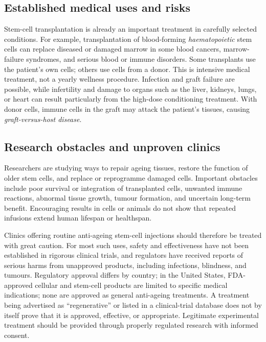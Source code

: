 \documentclass[11pt,oneside]{report}
\begin{document}
\subsection*{Established medical uses and risks}

Stem-cell transplantation is already an important treatment in carefully
selected conditions. For example, transplantation of blood-forming
\emph{haematopoietic} stem cells can replace diseased or damaged marrow in some
blood cancers, marrow-failure syndromes, and serious blood or immune disorders.
Some transplants use the patient's own cells; others use cells from a donor.
This is intensive medical treatment, not a yearly wellness procedure. Infection
and graft failure are possible, while infertility and damage to organs such as
the liver, kidneys, lungs, or heart can result particularly from the high-dose
conditioning treatment. With donor cells, immune cells in the graft may attack
the patient's tissues, causing \emph{graft-versus-host disease}.

\subsection*{Research obstacles and unproven clinics}

Researchers are studying ways to repair ageing tissues, restore the function of
older stem cells, and replace or reprogramme damaged cells. Important obstacles
include poor survival or integration of transplanted cells, unwanted immune
reactions, abnormal tissue growth, tumour formation, and uncertain long-term
benefit. Encouraging results in cells or animals do not show that repeated
infusions extend human lifespan or healthspan.

Clinics offering routine anti-ageing stem-cell injections should therefore be
treated with great caution. For most such uses, safety and effectiveness have
not been established in rigorous clinical trials, and regulators have received
reports of serious harms from unapproved products, including infections,
blindness, and tumours. Regulatory approval differs by country; in the United
States, FDA-approved cellular and stem-cell products are limited to specific
medical indications; none are approved as general anti-ageing treatments. A treatment
being advertised as ``regenerative'' or listed in a clinical-trial database does
not by itself prove that it is approved, effective, or appropriate. Legitimate
experimental treatment should be provided through properly regulated research
with informed consent.
\end{document}
